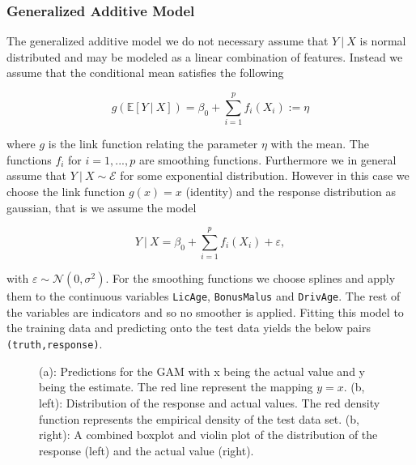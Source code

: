 \documentclass[
]{article}
\begin{document}
\hypertarget{generalized-additive-model}{%
\subsubsection{Generalized Additive
Model}\label{generalized-additive-model}}

The generalized additive model we do not necessary assume that
\(Y\ \vert\ X\) is normal distributed and may be modeled as a linear
combination of features. Instead we assume that the conditional mean
satisfies the following

\[
g\left(\mathbb E[Y\ \vert\ X]\right)=\beta_0 + \sum_{i=1}^pf_i(X_i):=\eta \tag{1}
\]

where \(g\) is the link function relating the parameter \(\eta\) with
the mean. The functions \(f_i\) for \(i=1,...,p\) are smoothing
functions. Furthermore we in general assume that
\(Y\ \vert\ X\sim \mathcal E\) for some exponential distribution.
However in this case we choose the link function \(g(x)=x\) (identity)
and the response distribution as gaussian, that is we assume the model

\[
Y\ \vert\ X=\beta_0 + \sum_{i=1}^pf_i(X_i)+\varepsilon,
\]

with \(\varepsilon\sim\mathcal N(0,\sigma^2)\). For the smoothing
functions we choose splines and apply them to the continuous variables
\texttt{LicAge}, \texttt{BonusMalus} and \texttt{DrivAge}. The rest of
the variables are indicators and so no smoother is applied. Fitting this
model to the training data and predicting onto the test data yields the
below pairs \texttt{(truth,response)}.

\begin{figure}[h]
    \centering
    \qquad
    \caption{(a): Predictions for the GAM with x being the actual value and y being the estimate. The red line represent the mapping $y=x$. (b, left): Distribution of the response and actual values. The red density function represents the empirical density of the test data set. (b, right): A combined boxplot and violin plot of the distribution of the response (left) and the actual value (right).}
\end{figure}
\end{document}
